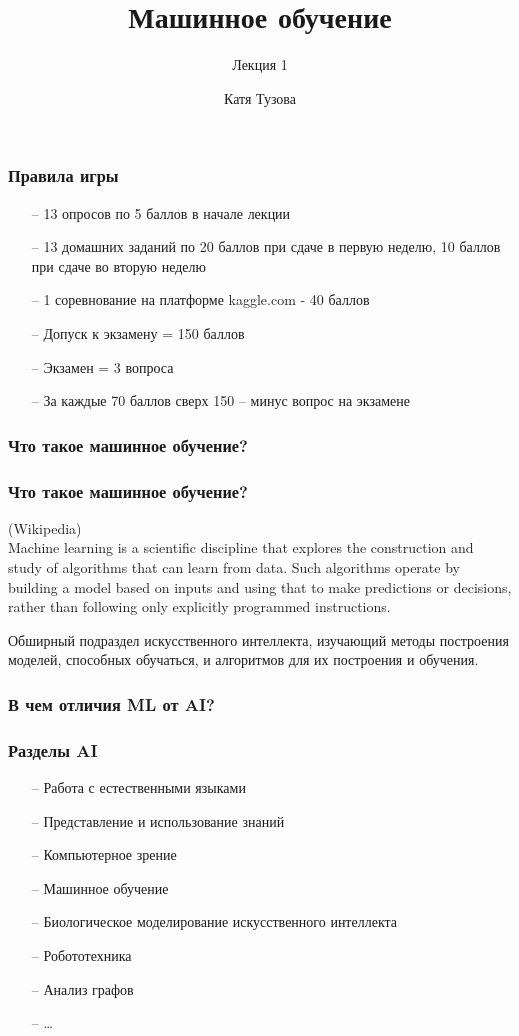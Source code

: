 \documentclass[12pt]{beamer}
\author{Катя Тузова}
\title{Машинное обучение}
\subtitle{Лекция 1}
\institute{JetBrains}
\date{}
\begin{document}
\frame{\titlepage}

\begin{frame}\frametitle{Правила игры}
\begin{itemize}
  \item[--] 13 опросов по 5 баллов в начале лекции
  \item[--] 13 домашних заданий по 20 баллов при сдаче в первую неделю, 
  10 баллов при сдаче во вторую неделю
  \item[--] 1 соревнование на платформе kaggle.com - 40 баллов
  \vspace{5mm}
  \item[--] Допуск к экзамену = 150 баллов
  \item[--] Экзамен = 3 вопроса
  \item[--] За каждые 70 баллов сверх 150 -- минус вопрос на экзамене
\end{itemize}
\end{frame}

\begin{frame}\frametitle{Что такое машинное обучение?}
\end{frame}

\begin{frame}\frametitle{Что такое машинное обучение?}
(Wikipedia)\\
Machine learning is a scientific discipline that explores the construction and study of algorithms that can learn from data. Such algorithms operate by building a model based on inputs and using that to make predictions or decisions, rather than following only explicitly programmed instructions. 
\vspace{5mm}

Обширный подраздел искусственного интеллекта, изучающий методы построения моделей, способных обучаться, и алгоритмов для их построения и обучения.\\

\end{frame}

\begin{frame}\frametitle{В чем отличия ML от AI?}
\end{frame}

\begin{frame}\frametitle{Разделы AI}
\begin{itemize}
  \item[--] Работа с естественными языками
\item[--] Представление и использование знаний
\item[--] Компьютерное зрение
\item[--] Машинное обучение
\item[--] Биологическое моделирование искусственного интеллекта
\item[--] Робототехника
\item[--] Анализ графов
\item[--] \ldots
\end{itemize}
\end{frame}
\end{document}
